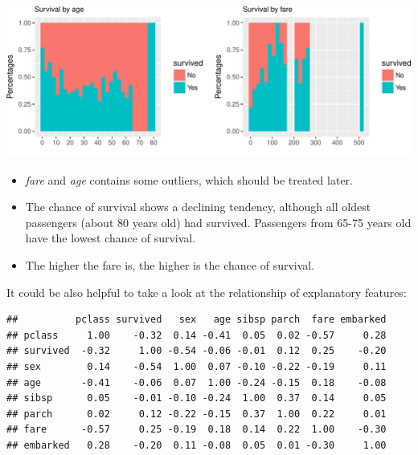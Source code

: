\documentclass[12,]{article}
\newenvironment{Shaded}{\begin{snugshade}}{\end{snugshade}}
\newcommand{\KeywordTok}[1]{\textcolor[rgb]{0.13,0.29,0.53}{\textbf{#1}}}
\newcommand{\DataTypeTok}[1]{\textcolor[rgb]{0.13,0.29,0.53}{#1}}
\newcommand{\DecValTok}[1]{\textcolor[rgb]{0.00,0.00,0.81}{#1}}
\newcommand{\StringTok}[1]{\textcolor[rgb]{0.31,0.60,0.02}{#1}}
\newcommand{\ControlFlowTok}[1]{\textcolor[rgb]{0.13,0.29,0.53}{\textbf{#1}}}
\newcommand{\OperatorTok}[1]{\textcolor[rgb]{0.81,0.36,0.00}{\textbf{#1}}}
\newcommand{\NormalTok}[1]{#1}
\providecommand{\tightlist}{%
  \setlength{\itemsep}{0pt}\setlength{\parskip}{0pt}}
\begin{document}
\includegraphics{Seminararbeit_1_Gruppe_2_files/figure-latex/unnamed-chunk-9-1.pdf}

\begin{itemize}
\tightlist
\item
  \emph{fare} and \emph{age} contains some outliers, which should be
  treated later.
\item
  The chance of survival shows a declining tendency, although all oldest
  passengers (about 80 years old) had survived. Passengers from 65-75
  years old have the lowest chance of survival.
\item
  The higher the fare is, the higher is the chance of survival.
\end{itemize}

It could be also helpful to take a look at the relationship of
explanatory features:

\begin{Shaded}
\end{Shaded}

\begin{verbatim}
##          pclass survived   sex   age sibsp parch  fare embarked
## pclass     1.00    -0.32  0.14 -0.41  0.05  0.02 -0.57     0.28
## survived  -0.32     1.00 -0.54 -0.06 -0.01  0.12  0.25    -0.20
## sex        0.14    -0.54  1.00  0.07 -0.10 -0.22 -0.19     0.11
## age       -0.41    -0.06  0.07  1.00 -0.24 -0.15  0.18    -0.08
## sibsp      0.05    -0.01 -0.10 -0.24  1.00  0.37  0.14     0.05
## parch      0.02     0.12 -0.22 -0.15  0.37  1.00  0.22     0.01
## fare      -0.57     0.25 -0.19  0.18  0.14  0.22  1.00    -0.30
## embarked   0.28    -0.20  0.11 -0.08  0.05  0.01 -0.30     1.00
\end{verbatim}
\end{document}
